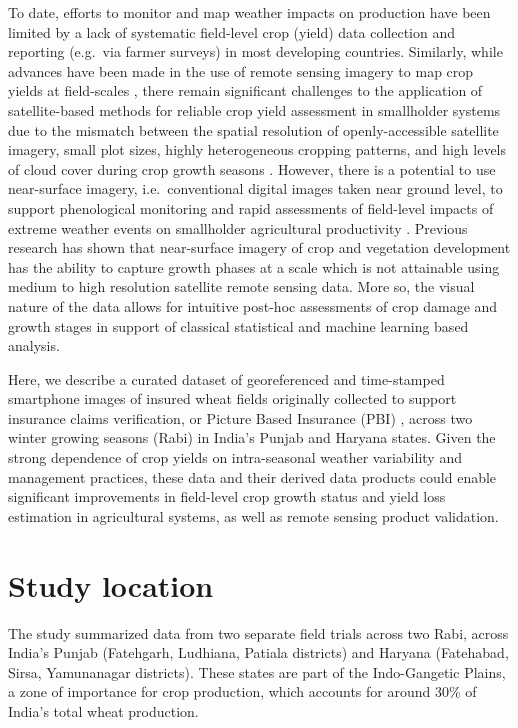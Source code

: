 \documentclass[, manuscript]{copernicus}
\begin{document}
To date, efforts to monitor and map weather impacts on production have
been limited by a lack of systematic field-level crop (yield) data
collection and reporting (e.g.~via farmer surveys) in most developing
countries. Similarly, while advances have been made in the use of remote
sensing imagery to map crop yields at field-scales
\citep{azzari2017, burke2017, jain2015}, there remain significant
challenges to the application of satellite-based methods for reliable
crop yield assessment in smallholder systems due to the mismatch between
the spatial resolution of openly-accessible satellite imagery, small
plot sizes, highly heterogeneous cropping patterns, and high levels of
cloud cover during crop growth seasons
\citep{duncan2015, jain2017, mann2017, hufkens2019}. However, there is a
potential to use near-surface imagery, i.e.~conventional digital images
taken near ground level, to support phenological monitoring and rapid
assessments of field-level impacts of extreme weather events on
smallholder agricultural productivity \citep{hufkens2019, ceballos2019}.
Previous research has shown that near-surface imagery of crop
\citep{hufkens2019} and vegetation \citep{hufkens2012} development has
the ability to capture growth phases at a scale which is not attainable
using medium to high resolution satellite remote sensing data. More so,
the visual nature of the data allows for intuitive post-hoc assessments
of crop damage and growth stages in support of classical statistical and
machine learning based analysis.

Here, we describe a curated dataset of georeferenced and time-stamped
smartphone images of insured wheat fields originally collected to
support insurance claims verification, or Picture Based Insurance (PBI)
\citep{ceballos2017}, across two winter growing seasons (Rabi) in
India's Punjab and Haryana states. Given the strong dependence of crop
yields on intra-seasonal weather variability and management practices,
these data and their derived data products could enable significant
improvements in field-level crop growth status and yield loss estimation
in agricultural systems, as well as remote sensing product validation.

\section{Study location}

The study summarized data from two separate field trials across two
Rabi, across India's Punjab (Fatehgarh, Ludhiana, Patiala districts) and
Haryana (Fatehabad, Sirsa, Yamunanagar districts). These states are part
of the Indo-Gangetic Plains, a zone of importance for crop production,
which accounts for around 30\% of India's total wheat production.
\end{document}
